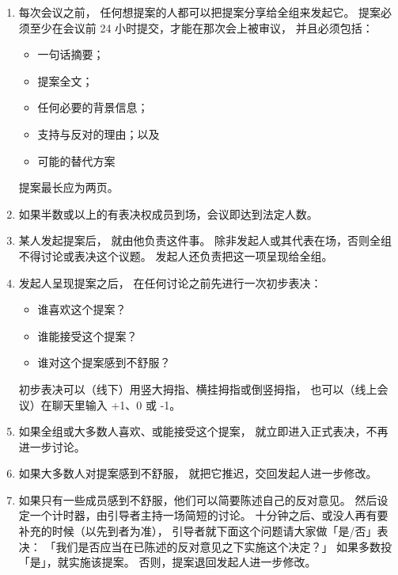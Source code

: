 \begin{enumerate}

\item
  每次会议之前，
  任何想提案的人都可以把提案分享给全组来发起它。
  提案必须至少在会议前 24 小时提交，才能在那次会上被审议，
  并且必须包括：
  \begin{itemize}
  \item 一句话摘要；
  \item 提案全文；
  \item 任何必要的背景信息；
  \item 支持与反对的理由；以及
  \item 可能的替代方案
  \end{itemize}
  提案最长应为两页。

\item
  如果半数或以上的有表决权成员到场，会议即达到法定人数。

\item
  某人发起提案后，
  就由他负责这件事。
  除非发起人或其代表在场，否则全组不得讨论或表决这个议题。
  发起人还负责把这一项呈现给全组。

\item
  发起人呈现提案之后，
  在任何讨论之前先进行一次初步表决：
  \begin{itemize}
  \item 谁喜欢这个提案？
  \item 谁能接受这个提案？
  \item 谁对这个提案感到不舒服？
  \end{itemize}
  初步表决可以（线下）用竖大拇指、横挂拇指或倒竖拇指，
  也可以（线上会议）在聊天里输入 +1、0 或 -1。

\item
  如果全组或大多数人喜欢、或能接受这个提案，
  就立即进入正式表决，不再进一步讨论。

\item
  如果大多数人对提案感到不舒服，
  就把它推迟，交回发起人进一步修改。

\item
  如果只有一些成员感到不舒服，他们可以简要陈述自己的反对意见。
  然后设定一个计时器，由引导者主持一场简短的讨论。
  十分钟之后、或没人再有要补充的时候（以先到者为准），
  引导者就下面这个问题请大家做「是/否」表决：
  「我们是否应当在已陈述的反对意见之下实施这个决定？」
  如果多数投「是」，就实施该提案。
  否则，提案退回发起人进一步修改。

\end{enumerate}


